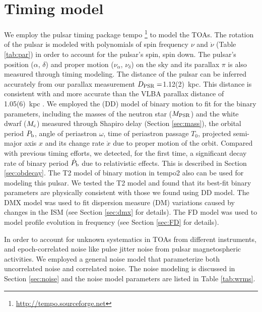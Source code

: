 \section{Timing model}
\label{sec:model}
We employ the pulsar timing package {\sc tempo}
\footnote{\url{http://tempo.sourceforge.net}} to model the TOAs. 
The rotation of the pulsar is modeled with polynomials of spin frequency 
$\nu$ and $\dot{\nu}$ (Table \ref{tab:par}) in order to account
for the pulsar's spin, spin down.
The pulsar's position ($\alpha$, $\delta$) and proper motion ($\nu_\alpha$, $
\nu_\delta$) on the sky and its parallax $\pi$ is also measured through timing modeling. 
The distance of the pulsar can be inferred accurately from our parallax
measurement $D_{\rm PSR}=$1.12(2)~kpc. This distance is consistent with and
more accurate than the VLBA parallax distance of 1.05(6)~kpc \citep{cbv+09}.
We employed the \citet{dd86} (DD) model of binary motion to fit for the binary parameters, 
including the masses of
the neutron star ($M_{\rm PSR}$) and the white dwarf ($M_{\rm c}$) measured
through Shapiro delay (Section \ref{sec:mass}),
the orbital period $P_{\rm b}$, angle of periastron $\omega$, time of
periastron passage $T_0$, projected semi-major axis $x$ and its change rate
$\dot{x}$ due to proper motion of the orbit. 
Compared with previous timing efforts, we detected, for the first time, a
significant decay rate of binary period $\dot{P}_{\rm b}$ due to relativistic
effects. This is described in Section \ref{sec:obdecay}.    
The T2 model of binary motion in {\sc tempo2} \citep{hem06} also can be used for modeling this pulsar. We tested the T2 model and found that its best-fit binary parameters are physically consistent with those we found using DD model.
The DMX model was used to fit dispersion measure (DM) variations caused by changes in the ISM (see Section \ref{sec:dmx} for details). The FD model was used to model profile
evolution in frequency (see Section \ref{sec:FD} for details). 

{\bfref
In order to account for unknown systematics in TOAs from different
instruments, and epoch-correlated noise like pulse jitter noise from pulsar
magnetospheric activities. 
We employed a general noise model that parameterize both uncorrelated noise and
correlated noise. The noise modeling is discussed in Section \ref{sec:noise} and the
noise model parameters are listed in Table \ref{tab:wrms}. 
}

